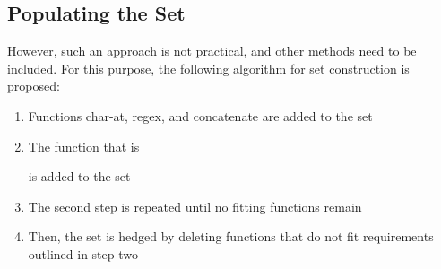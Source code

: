 \documentclass[11pt,nonacm,natbib=false]{acmart}
\begin{document}
\subsection{Populating the Set}
However, such an approach is not practical, and other methods need to be  included. For this purpose, the following algorithm for set construction is proposed:
\begin{enumerate}
    \item Functions char-at, regex, and concatenate are added to the set
    \item The function that is 
        is added to the set
    \item The second step is repeated until no fitting functions remain
    \item Then, the set is hedged by deleting functions that do not fit requirements outlined in step two
\end{enumerate}
\end{document}

